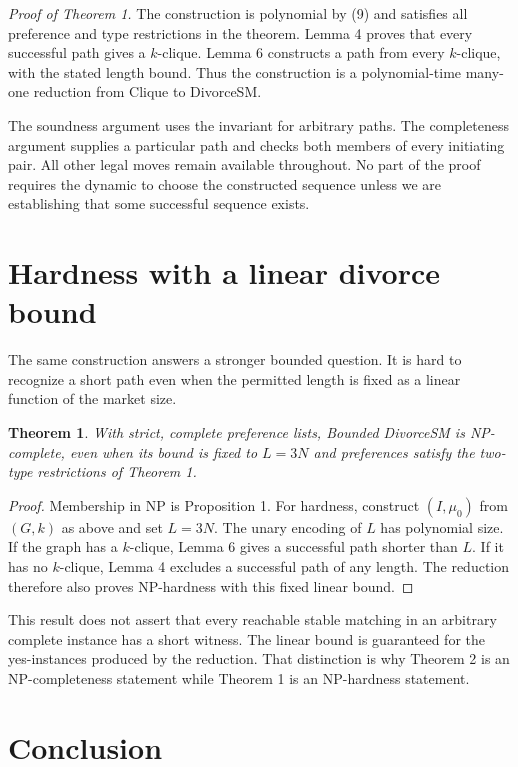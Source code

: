 \documentclass[11pt,letterpaper]{article}
\newtheorem{theorem}{Theorem}
\theoremstyle{definition}
\begin{document}
\noindent\textit{Proof of Theorem 1.}
The construction is polynomial by (9) and satisfies all preference and type restrictions in the theorem. Lemma 4 proves that every successful path gives a $k$-clique. Lemma 6 constructs a path from every $k$-clique, with the stated length bound. Thus the construction is a polynomial-time many-one reduction from Clique to DivorceSM.

The soundness argument uses the invariant for arbitrary paths. The completeness argument supplies a particular path and checks both members of every initiating pair. All other legal moves remain available throughout. No part of the proof requires the dynamic to choose the constructed sequence unless we are establishing that some successful sequence exists.

\section{Hardness with a linear divorce bound}

The same construction answers a stronger bounded question. It is hard to recognize a short path even when the permitted length is fixed as a linear function of the market size.

\begin{theorem}
With strict, complete preference lists, Bounded DivorceSM is NP-complete, even when its bound is fixed to $L=3N$ and preferences satisfy the two-type restrictions of Theorem 1.
\end{theorem}
\begin{proof}
Membership in NP is Proposition 1. For hardness, construct $(I,\mu_0)$ from $(G,k)$ as above and set $L=3N$. The unary encoding of $L$ has polynomial size. If the graph has a $k$-clique, Lemma 6 gives a successful path shorter than $L$. If it has no $k$-clique, Lemma 4 excludes a successful path of any length. The reduction therefore also proves NP-hardness with this fixed linear bound.
\end{proof}

This result does not assert that every reachable stable matching in an arbitrary complete instance has a short witness. The linear bound is guaranteed for the yes-instances produced by the reduction. That distinction is why Theorem 2 is an NP-completeness statement while Theorem 1 is an NP-hardness statement.

\section{Conclusion}
\end{document}
